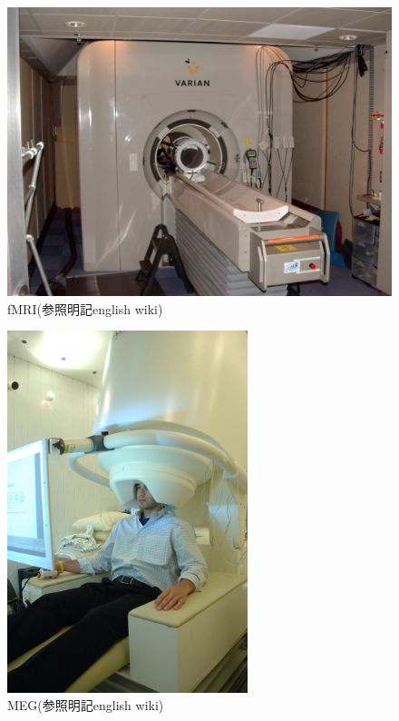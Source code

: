 \begin{figure}
    \begin{center}
    \includegraphics[width=140mm]{images/fMRI.jpg}
    \end{center}
    \caption{fMRI(参照明記english wiki)}
    \label{fig:fMRI}
\end{figure}
\begin{figure}
    \begin{center}
    \includegraphics[width=70mm]{images/MEG.jpg}
    \end{center}
    \caption{MEG(参照明記english wiki)}
    \label{fig:MEG}
\end{figure}

